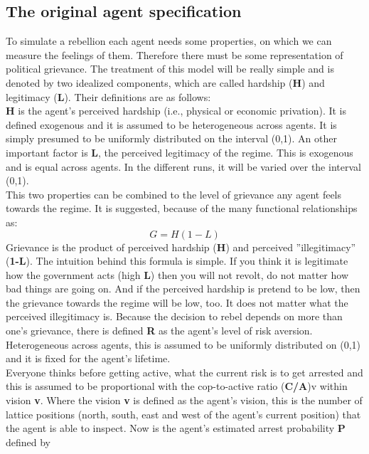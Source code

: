 \documentclass[11pt]{article}
\begin{document}
\subsection{The original agent specification}
To simulate a rebellion each agent needs some properties, on which we can measure the feelings of them. Therefore there must be some representation of political grievance. The treatment of this model will be really simple and is denoted by two idealized components, which are called hardship (\textbf{H}) and legitimacy (\textbf{L}). Their definitions are as follows:\\
\textbf{H} is the agent's perceived hardship (i.e., physical or economic privation). It is defined exogenous and it is assumed to be heterogeneous across agents. It is simply presumed to be uniformly distributed on the interval (0,1). An other important factor is \textbf{L}, the perceived legitimacy of the regime. This is exogenous and is equal across agents. In the different runs, it will be varied over the interval (0,1).\\
This two properties can be combined to the level of grievance any agent feels towards the regime. It is suggested, because of the many functional relationships as: 
\begin{equation}
G=H(1-L)
\end{equation}
Grievance is the product of perceived hardship (\textbf{H}) and perceived ''illegitimacy'' (\textbf{1-L}). The intuition behind this formula is simple. If you think it is legitimate how the government acts (high \textbf{L}) then you will not revolt, do not matter how bad things are going on. And if the perceived hardship is pretend to be low, then the grievance towards the regime will be low, too. It does not matter what the perceived illegitimacy is.
Because the decision to rebel depends on more than one's grievance, there is defined \textbf{R} as the agent's level of risk aversion. Heterogeneous across agents, this is assumed to be uniformly distributed on (0,1) and it is fixed for the agent's lifetime.\\
Everyone thinks before getting active, what the current risk is to get arrested and this is assumed to be proportional with the cop-to-active ratio (\textbf{C/A}){\footnotesize v} within vision \textbf{v}. Where the vision \textbf{v} is defined as the agent's vision, this is the number of lattice positions (north, south, east and west of the agent's current position) that the agent is able to inspect. Now is the agent's estimated arrest probability \textbf{P} defined by
\end{document}
